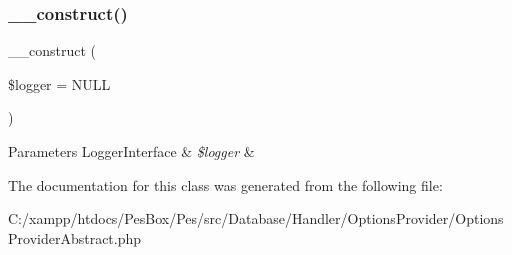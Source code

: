 \subsubsection{\texorpdfstring{\+\_\+\+\_\+construct()}{\_\_construct()}}
{\footnotesize\ttfamily \+\_\+\+\_\+construct (\begin{DoxyParamCaption}\item[{Logger\+Interface}]{\$logger = {\ttfamily NULL} }\end{DoxyParamCaption})}


\begin{DoxyParams}[1]{Parameters}
Logger\+Interface & {\em \$logger} & \\
\hline
\end{DoxyParams}


The documentation for this class was generated from the following file\+:\begin{DoxyCompactItemize}
\item 
C\+:/xampp/htdocs/\+Pes\+Box/\+Pes/src/\+Database/\+Handler/\+Options\+Provider/Options\+Provider\+Abstract.\+php\end{DoxyCompactItemize}
